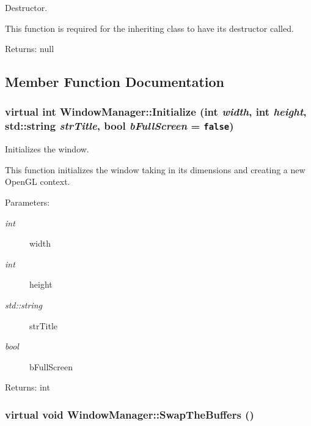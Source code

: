 Destructor. 

This function is required for the inheriting class to have its destructor called.

\begin{Desc}
\item[Returns:]null \end{Desc}


\subsection{Member Function Documentation}
\hypertarget{class_window_manager_b389ab7ab5fab8add272fb6e6d139a2a}{
\subsubsection[Initialize]{\setlength{\rightskip}{0pt plus 5cm}virtual int WindowManager::Initialize (int {\em width}, \/  int {\em height}, \/  std::string {\em strTitle}, \/  bool {\em bFullScreen} = {\tt false})}}
\label{class_window_manager_b389ab7ab5fab8add272fb6e6d139a2a}


Initializes the window. 

This function initializes the window taking in its dimensions and creating a new OpenGL context.

\begin{Desc}
\item[Parameters:]
\begin{description}
\item[{\em int}]width \item[{\em int}]height \item[{\em std::string}]strTitle \item[{\em bool}]bFullScreen \end{description}
\end{Desc}
\begin{Desc}
\item[Returns:]int \end{Desc}
\hypertarget{class_window_manager_bc3dfc535171f18eda134734e6d546ef}{
\subsubsection[SwapTheBuffers]{\setlength{\rightskip}{0pt plus 5cm}virtual void WindowManager::SwapTheBuffers ()}}
\label{class_window_manager_bc3dfc535171f18eda134734e6d546ef}


